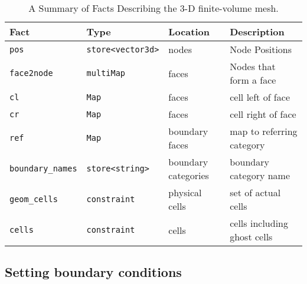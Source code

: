 \documentclass[10pt,epsf,letterpaper,twoside]{book}
\begin{document}
\begin{table}[htbp]
\label{fvmfacts}
\caption{ A Summary of Facts Describing the 3-D finite-volume mesh.}
\begin{center}
  \begin{tabular}{|l|l|l|l|}
    \hline
    Fact  & Type & Location & Description\\
    \hline\hline
    {\tt pos} & {\tt store<vector3d>} & nodes & Node Positions\\
    {\tt face2node} & {\tt multiMap} & faces & Nodes that form a
    face\\
    {\tt cl} & {\tt Map} & faces & cell left of face\\
    {\tt cr} & {\tt Map} & faces & cell right of face\\
    {\tt ref} & {\tt Map} & boundary faces & map to referring category\\
    {\tt boundary\_names} & {\tt store<string>} & boundary categories & boundary category name\\
    {\tt geom\_cells} & {\tt constraint} & physical cells & set of actual cells\\
{\tt cells} & {\tt constraint} & cells & cells including ghost cells\\
    \hline
  \end{tabular}
\end{center}
\end{table}

\subsection{ Setting boundary conditions}
\end{document}
